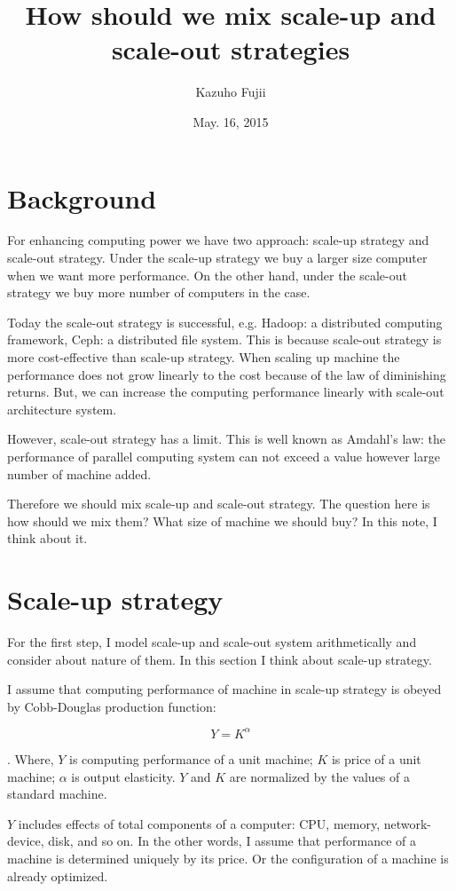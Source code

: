 \documentclass[a4paper,11pt]{article}
\title{How should we mix scale-up and scale-out strategies}
\author{Kazuho Fujii}
\date{May. 16, 2015}
\begin{document}
\maketitle

\section{Background}

For enhancing computing power we have two approach: scale-up strategy and 
scale-out strategy. Under the scale-up strategy we buy a larger size computer
when we want more performance. On the other hand, under the scale-out strategy
 we buy more number of computers in the case.

Today the scale-out strategy is successful, e.g. Hadoop: a distributed
computing framework, Ceph: a distributed file system. This is because 
scale-out strategy is more cost-effective than scale-up strategy. When scaling 
up machine the performance does not grow linearly to the cost because of the law
of diminishing returns. But, we can increase the computing performance linearly
with scale-out architecture system.

However, scale-out strategy has a limit. This is well known as Amdahl's law: the
performance of parallel computing system can not exceed a value however large
number of machine added.

Therefore we should mix scale-up and scale-out strategy. The question here is
how should we mix them? What size of machine we should buy? In this note, I
think about it.

\section{Scale-up strategy}

For the first step, I model scale-up and scale-out system arithmetically and
consider about nature of them. In this section I think about scale-up strategy.

I assume that computing performance of machine in scale-up strategy is obeyed
by Cobb-Douglas production function:

$$
Y = K^\alpha
$$

. Where, $Y$ is computing performance of a unit machine;
$K$ is price of a unit machine; $\alpha$ is output elasticity.
$Y$ and $K$ are normalized by the values of a standard machine.

$Y$ includes effects of total components of a computer: CPU, memory, network-device, disk, and so on.
In the other words, I assume that performance of a machine is determined uniquely by its price.
Or the configuration of a machine is already optimized. 
\end{document}
